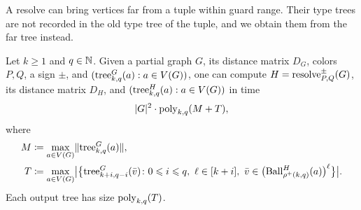 
A resolve can bring vertices far from a tuple within guard range.
Their type trees are not recorded in the old type tree of the tuple, and we obtain them from the far tree instead.

\begin{lemma}\label{lem:resolve-lift}
Let $k\ge1$ and $q\in\mathbb N$.
Given a partial graph $G$, its distance matrix $D_G$, colors $P,Q$,
a sign $\pm$, and
$(\mathrm{tree}^G_{k,q}(a):a\in V(G))$, one can compute
$H=\mathrm{resolve}^{\pm}_{P,Q}(G)$, its distance matrix $D_H$, and
$(\mathrm{tree}^{H}_{k,q}(a):a\in V(G))$ in time
\[
|G|^2\cdot\mathrm{poly}_{k,q}(M+T),
\]
where
\begin{align*}
M&\coloneqq\max_{a\in V(G)}\lVert \mathrm{tree}^G_{k,q}(a)\rVert,\\
T&\coloneqq\max_{a\in V(G)}\bigl|\bigl\{\mathrm{tree}^G_{k+i,q-i}(\bar v)\colon 0\leqslant i\leqslant q,\ \ell\in[k+i],\ \bar v\in\bigl(\operatorname{Ball}^{H}_{\rho^+(k,q)}(a)\bigr)^{\ell}\bigr\}\bigr|.
\end{align*}
Each output tree has size $\mathrm{poly}_{k,q}(T)$.
\end{lemma}
